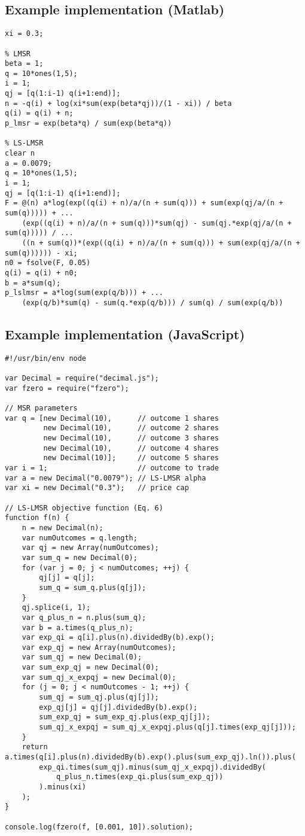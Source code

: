 \documentclass[floatfix,reprint,nofootinbib,amsmath,amssymb,epsfig,pre,floats,letterpaper,groupedaffiliation]{revtex4}
\begin{document}
\subsection*{Example implementation (Matlab)}
\begin{lstlisting}[language=generic]
% price cap
xi = 0.3;

% LMSR
beta = 1;
q = 10*ones(1,5);
i = 1;
qj = [q(1:i-1) q(i+1:end)];
n = -q(i) + log(xi*sum(exp(beta*qj))/(1 - xi)) / beta
q(i) = q(i) + n;
p_lmsr = exp(beta*q) / sum(exp(beta*q))

% LS-LMSR
clear n
a = 0.0079;
q = 10*ones(1,5);
i = 1;
qj = [q(1:i-1) q(i+1:end)];
F = @(n) a*log(exp((q(i) + n)/a/(n + sum(q))) + sum(exp(qj/a/(n + sum(q))))) + ...
    (exp((q(i) + n)/a/(n + sum(q)))*sum(qj) - sum(qj.*exp(qj/a/(n + sum(q))))) / ...
    ((n + sum(q))*(exp((q(i) + n)/a/(n + sum(q))) + sum(exp(qj/a/(n + sum(q)))))) - xi;
n0 = fsolve(F, 0.05)
q(i) = q(i) + n0;
b = a*sum(q);
p_lslmsr = a*log(sum(exp(q/b))) + ...
    (exp(q/b)*sum(q) - sum(q.*exp(q/b))) / sum(q) / sum(exp(q/b))
\end{lstlisting}

\newpage

\subsection*{Example implementation (JavaScript)}
\begin{lstlisting}[language=generic]
#!/usr/bin/env node

var Decimal = require("decimal.js");
var fzero = require("fzero");

// MSR parameters
var q = [new Decimal(10),      // outcome 1 shares
         new Decimal(10),      // outcome 2 shares
         new Decimal(10),      // outcome 3 shares
         new Decimal(10),      // outcome 4 shares
         new Decimal(10)];     // outcome 5 shares
var i = 1;                     // outcome to trade
var a = new Decimal("0.0079"); // LS-LMSR alpha
var xi = new Decimal("0.3");   // price cap

// LS-LMSR objective function (Eq. 6)
function f(n) {
    n = new Decimal(n);
    var numOutcomes = q.length;
    var qj = new Array(numOutcomes);
    var sum_q = new Decimal(0);
    for (var j = 0; j < numOutcomes; ++j) {
        qj[j] = q[j];
        sum_q = sum_q.plus(q[j]);
    }
    qj.splice(i, 1);
    var q_plus_n = n.plus(sum_q);
    var b = a.times(q_plus_n);
    var exp_qi = q[i].plus(n).dividedBy(b).exp();
    var exp_qj = new Array(numOutcomes);
    var sum_qj = new Decimal(0);
    var sum_exp_qj = new Decimal(0);
    var sum_qj_x_expqj = new Decimal(0);
    for (j = 0; j < numOutcomes - 1; ++j) {
        sum_qj = sum_qj.plus(qj[j]);
        exp_qj[j] = qj[j].dividedBy(b).exp();
        sum_exp_qj = sum_exp_qj.plus(exp_qj[j]);
        sum_qj_x_expqj = sum_qj_x_expqj.plus(q[j].times(exp_qj[j]));
    }
    return a.times(q[i].plus(n).dividedBy(b).exp().plus(sum_exp_qj).ln()).plus(
        exp_qi.times(sum_qj).minus(sum_qj_x_expqj).dividedBy(
            q_plus_n.times(exp_qi.plus(sum_exp_qj))
        ).minus(xi)
    );
}

console.log(fzero(f, [0.001, 10]).solution);
\end{lstlisting}
\end{document}
